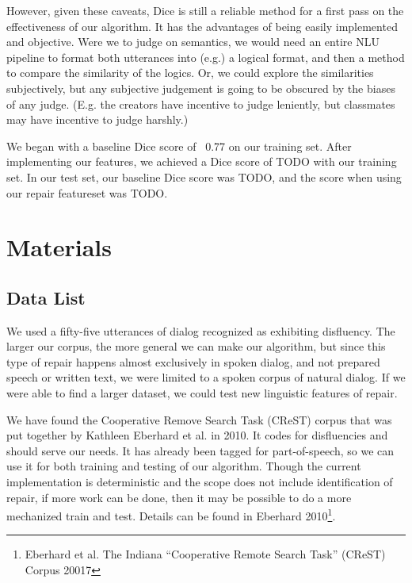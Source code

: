 \documentclass{article}
\begin{document}
\begin{flushleft}
\begin{flushleft}
  However, given these caveats, Dice is still a reliable method for a first pass on the effectiveness of our algorithm. It has the advantages of being easily implemented and objective. Were we to judge on semantics, we would need an entire NLU pipeline to format both utterances into (e.g.) a logical format, and then a method to compare the similarity of the logics. Or, we could explore the similarities subjectively, but any subjective judgement is going to be obscured by the biases of any judge. (E.g. the creators have incentive to judge leniently, but classmates may have incentive to judge harshly.)
  
\end{flushleft}

\begin{flushleft}

  We began with a baseline Dice score of ~0.77 on our training set. After implementing our features, we achieved a Dice score of TODO with our training set. In our test set, our baseline Dice score was TODO, and the score when using our repair featureset was TODO.

\section{Materials}
\subsection{Data List}

\begin{flushleft}

We used a fifty-five utterances of dialog recognized as exhibiting disfluency. The larger our corpus, the more general we can make our algorithm, but since this type of repair happens almost exclusively in spoken dialog, and not prepared speech or written text, we were limited to a spoken corpus of natural dialog. If we were able to find a larger dataset, we could test new linguistic features of repair.

\end{flushleft}

\begin{flushleft}

  We have found the Cooperative Remove Search Task (CReST) corpus that was put together by Kathleen Eberhard et al. in 2010. It codes for disfluencies and should serve our needs. It has already been tagged for part-of-speech, so we can use it for both training and testing of our algorithm. Though the current implementation is deterministic and the scope does not include identification of repair, if more work can be done, then it may be possible to do a more mechanized train and test. Details can be found in Eberhard 2010\footnote{Eberhard et al. The Indiana ``Cooperative Remote Search Task'' (CReST) Corpus 20017}. 


\end{flushleft}
\end{flushleft}
\end{flushleft}
\end{document}
